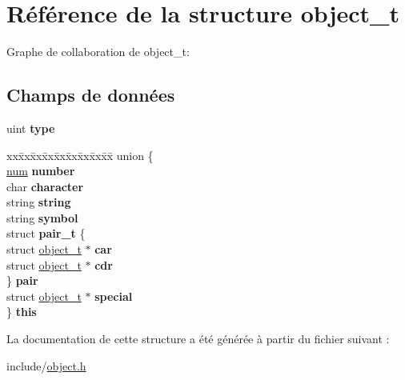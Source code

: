 \hypertarget{structobject__t}{}\section{Référence de la structure object\+\_\+t}
\label{structobject__t}


Graphe de collaboration de object\+\_\+t\+:
\subsection*{Champs de données}
\begin{DoxyCompactItemize}
\item 
uint {\bfseries type}\hypertarget{structobject__t_a92c5cda86022a69772cb8b6edba7530c}{}\label{structobject__t_a92c5cda86022a69772cb8b6edba7530c}

\item 
\begin{tabbing}
xx\=xx\=xx\=xx\=xx\=xx\=xx\=xx\=xx\=\kill
union \{\\
\>\hyperlink{structnum__t}{num} {\bfseries number}\\
\>char {\bfseries character}\\
\>string {\bfseries string}\\
\>string {\bfseries symbol}\\
\>struct {\bfseries pair\_t} \{\\
\>\>struct \hyperlink{structobject__t}{object\_t} $\ast$ {\bfseries car}\\
\>\>struct \hyperlink{structobject__t}{object\_t} $\ast$ {\bfseries cdr}\\
\>\} {\bfseries pair}\\
\>struct \hyperlink{structobject__t}{object\_t} $\ast$ {\bfseries special}\\
\} {\bfseries this}\hypertarget{structobject__t_ace8394a5a873527066c787412642bef1}{}\label{structobject__t_ace8394a5a873527066c787412642bef1}
\\

\end{tabbing}\end{DoxyCompactItemize}


La documentation de cette structure a été générée à partir du fichier suivant \+:\begin{DoxyCompactItemize}
\item 
include/\hyperlink{object_8h}{object.\+h}\end{DoxyCompactItemize}
